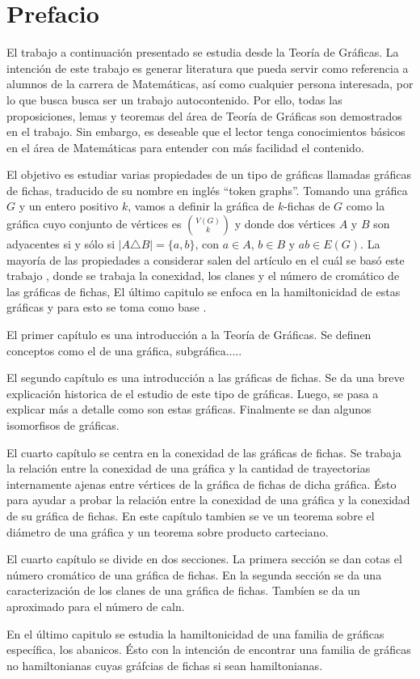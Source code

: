\chapter{Prefacio}
\label{sec:prefacio}

El trabajo a continuaci\'on presentado se estudia desde la Teor\'ia de
Gr\'aficas. La intenci\'on de este trabajo es generar literatura que pueda
servir como referencia a alumnos de la carrera de Matem\'aticas, as\'i como
cualquier persona interesada, por lo que busca busca ser un trabajo
autocontenido. Por ello, todas las proposiciones, lemas y teoremas del \'area de
Teor\'ia de Gr\'aficas son demostrados en el trabajo. Sin embargo, es deseable
que el lector tenga conocimientos b\'asicos en el \'area de Matem\'aticas para
entender con m\'as facilidad el contenido. 

El objetivo es estudiar varias propiedades de un tipo de gr\'aficas llamadas
gr\'aficas de fichas, traducido de su nombre en ingl\'es ``token graphs''.
Tomando una gr\'afica $G$ y un entero positivo $k$, vamos a definir la
gr\'afica de $k$-fichas de $G$ como la gr\'afica cuyo conjunto de v\'ertices
es $\binom{V(G)}{k}$ y donde dos v\'ertices $A$ y $B$ son adyacentes si y
s\'olo si $|A \triangle B| = \{a,b\}$, con $a \in A$, $b \in B$ y $ab \in
E(G)$. 
La mayor\'ia de las propiedades a considerar salen del art\'iculo en el cu\'al
se bas\'o este trabajo \cite{fabilaToken}, donde se trabaja la conexidad, los
clanes y el n\'umero de crom\'atico de las gr\'aficas de fichas, El \'ultimo
capitulo se enfoca en la hamiltonicidad de estas gr\'aficas y para esto se toma
como base \cite{adameHamilt}. 

El primer cap\'itulo es una introducci\'on a la Teor\'ia de Gr\'aficas. Se
definen conceptos como el de una gr\'afica, subgr\'afica.....

El segundo cap\'itulo es una introducci\'on a las gr\'aficas de fichas. Se da
una breve explicaci\'on historica de el estudio de este tipo de gr\'aficas.
Luego, se pasa a explicar m\'as a detalle como son estas gr\'aficas. Finalmente
se dan algunos isomorfisos de gr\'aficas.

El cuarto cap\'itulo se centra en la conexidad de las gr\'aficas de fichas. Se
trabaja la relaci\'on entre la conexidad de una gr\'afica y la cantidad de
trayectorias internamente ajenas entre v\'ertices de la gr\'afica de fichas de
dicha gr\'afica. \'Esto para ayudar a probar la relaci\'on entre la conexidad de
una gr\'afica y la conexidad de su gr\'afica de fichas. En este cap\'itulo
tambien se ve un teorema sobre el di\'ametro de una gr\'afica y un teorema sobre
producto carteciano.

El cuarto cap\'itulo se  divide en dos secciones. La primera secci\'on se dan
cotas el n\'umero crom\'atico de una gr\'afica de fichas. En la segunda
secci\'on se da una caracterizaci\'on de los clanes de una gr\'afica de fichas.
Tamb\'ien se da un aproximado para el n\'umero de caln.

En el \'ultimo capitulo se estudia la hamiltonicidad de una familia de
gr\'aficas espec\'ifica, los abanicos. \'Esto con la intenci\'on de encontrar
una familia de gr\'aficas no hamiltonianas cuyas gr\'afcias de fichas si sean
hamiltonianas.